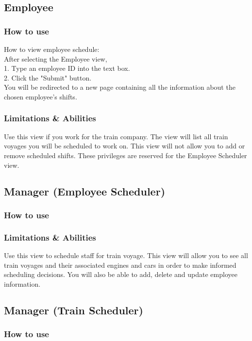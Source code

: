 \documentclass[letter]{article}
\begin{document}
\subsection{Employee}
\subsubsection{How to use}
How to view employee schedule:\\
After selecting the Employee view,\\ 
1. Type an employee ID into the text box.\\
2. Click the "Submit" button. \\
You will be redirected to a new page containing all the information about the chosen employee's shifts.\\


\subsubsection{Limitations \& Abilities}
Use this view if you work for the train company. The view will list all train voyages you will be scheduled to work on.  This view will not allow you to add or remove scheduled shifts. These privileges are reserved for the Employee Scheduler view.


\subsection{Manager (Employee Scheduler)}
\subsubsection{How to use}

\subsubsection{Limitations \& Abilities}
Use this view to schedule staff for train voyage. This view will allow you to see all train voyages and their associated engines and cars in order to make informed scheduling decisions. You will also be able to add, delete and update employee information.


\subsection{Manager (Train Scheduler)}
\subsubsection{How to use}
\end{document}
